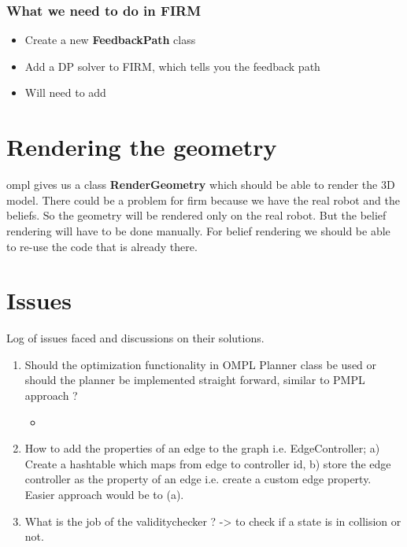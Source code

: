 \subsubsection{What we need to do in FIRM}

\begin{itemize}
 \item Create a new \textbf{FeedbackPath} class
 \item Add a DP solver to FIRM, which tells you the feedback path
 \item Will need to add 
\end{itemize}

\section{Rendering the geometry}

ompl gives us a class \textbf{RenderGeometry} which should be able to render the 3D model. There could be a problem for firm because we have the
real robot and the beliefs. So the geometry will be rendered only on the real robot. But the belief rendering will have to be done manually.
For belief rendering we should be able to re-use the code that is already there.

\section{Issues}
Log of issues faced and discussions on their solutions.

\begin{enumerate}
 \item Should the optimization functionality in OMPL Planner class be used or should the planner be implemented straight forward, similar to PMPL approach ?
    \begin{itemize}
     \item 
    \end{itemize}
\item How to add the properties of an edge to the graph i.e. EdgeController; a) Create a hashtable which maps from edge to controller id, b) store the edge controller as the property of an edge i.e. create a custom edge property. Easier approach would be to (a).

 \item What is the job of the validitychecker ? -> to check if a state is in collision or not. 

\end{enumerate}

